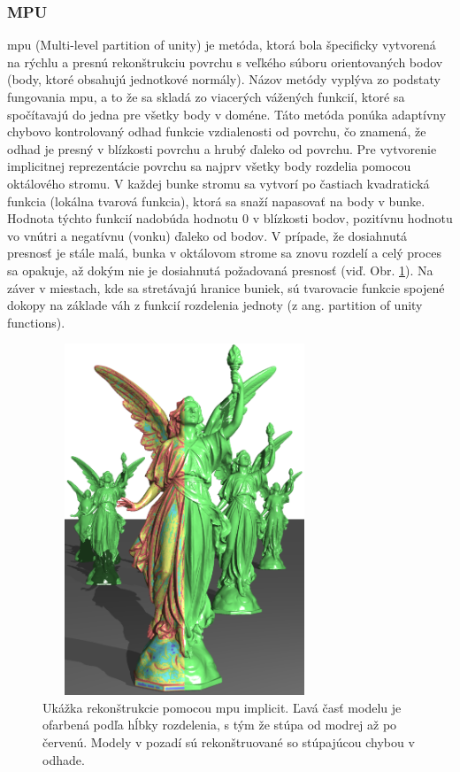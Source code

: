 \subsubsection{MPU}
\noindent \acrshort{mpu} (Multi-level partition of unity) je metóda, ktorá bola špecificky vytvorená na rýchlu a presnú rekonštrukciu povrchu s veľkého súboru orientovaných bodov (body, ktoré obsahujú jednotkové normály). Názov metódy vyplýva zo podstaty fungovania \acrshort{mpu}, a to že sa skladá zo viacerých vážených funkcií, ktoré sa spočítavajú do jedna pre všetky body v doméne. Táto metóda ponúka adaptívny chybovo kontrolovaný odhad funkcie vzdialenosti od povrchu, čo znamená, že odhad je presný v blízkosti povrchu a hrubý ďaleko od povrchu. \cite{MPU_orig}
\newline\indent Pre vytvorenie implicitnej reprezentácie povrchu sa najprv všetky body rozdelia pomocou oktálového stromu. V každej bunke stromu sa vytvorí po častiach kvadratická funkcia (lokálna tvarová funkcia), ktorá sa snaží napasovať na body v bunke. Hodnota týchto funkcií nadobúda hodnotu 0 v blízkosti bodov, pozitívnu hodnotu vo vnútri a negatívnu (vonku) ďaleko od bodov. V prípade, že dosiahnutá presnosť je stále malá, bunka v oktálovom strome sa znovu rozdelí a celý proces sa opakuje, až dokým nie je dosiahnutá požadovaná presnosť (viď. Obr. \ref{fig:MPU}). Na záver v miestach, kde sa stretávajú hranice buniek, sú tvarovacie funkcie spojené dokopy na základe váh z funkcií rozdelenia jednoty (z ang. partition of unity functions). \cite{MPU_orig}
\begin{figure}[!htbp]
  \centering
  \includegraphics[width=8.5cm, height=10.5cm]{img/MPU_img.png}
  \caption{Ukážka rekonštrukcie pomocou \acrshort{mpu} implicit. Ľavá časť modelu je ofarbená podľa hĺbky rozdelenia, s tým že stúpa od modrej až po červenú. Modely v pozadí sú rekonštruované so stúpajúcou chybou v odhade. \cite{MPU_orig}} 
  \label{fig:MPU}
\end{figure} 

